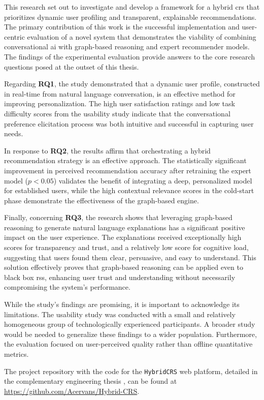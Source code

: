 This research set out to investigate and develop a framework for a hybrid \ac{crs} that prioritizes dynamic user profiling and transparent, explainable recommendations. The primary contribution of this work is the successful implementation and user-centric evaluation of a novel system that demonstrates the viability of combining conversational \ac{ai} with graph-based reasoning and expert recommender models. The findings of the experimental evaluation provide answers to the core research questions posed at the outset of this thesis.

Regarding \textbf{RQ1}, the study demonstrated that a dynamic user profile, constructed in real-time from natural language conversation, is an effective method for improving personalization. The high user satisfaction ratings and low task difficulty scores from the usability study indicate that the conversational preference elicitation process was both intuitive and successful in capturing user needs.

In response to \textbf{RQ2}, the results affirm that orchestrating a hybrid recommendation strategy is an effective approach. The statistically significant improvement in perceived recommendation accuracy after retraining the expert model ($p < 0.05$) validates the benefit of integrating a deep, personalized model for established users, while the high contextual relevance scores in the cold-start phase demonstrate the effectiveness of the graph-based engine.

Finally, concerning \textbf{RQ3}, the research shows that leveraging graph-based reasoning to generate natural language explanations has a significant positive impact on the user experience. The explanations received exceptionally high scores for transparency and trust, and a relatively low score for cognitive load, suggesting that users found them clear, persuasive, and easy to understand. This solution effectively proves that graph-based reasoning can be applied even to black box \aclp{rs}, enhancing user trust and understanding without necessarily compromising the system's performance.

While the study's findings are promising, it is important to acknowledge its limitations. The usability study was conducted with a small and relatively homogeneous group of technologically experienced participants. A broader study would be needed to generalize these findings to a wider population. Furthermore, the evaluation focused on user-perceived quality rather than offline quantitative metrics.

The project repository with the code for the \texttt{HybridCRS} web platform, detailed in the complementary engineering thesis \cite{MUII_THESIS}, can be found at \url{https://github.com/Acervans/Hybrid-CRS}.